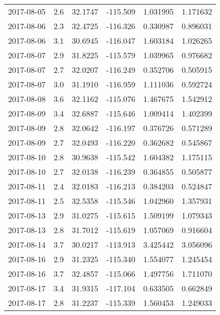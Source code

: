 \begin{tabular}{lrrrrr}
2017-08-05 &       2.6 &  32.1747 &  -115.509 &         1.031995 &         1.171632 \\
2017-08-06 &       2.3 &  32.4725 &  -116.326 &         0.330987 &         0.896031 \\
2017-08-06 &       3.1 &  30.6945 &  -116.047 &         1.603184 &         1.026265 \\
2017-08-07 &       2.9 &  31.8225 &  -115.579 &         1.039965 &         0.976682 \\
2017-08-07 &       2.7 &  32.0207 &  -116.249 &         0.352706 &         0.505915 \\
2017-08-07 &       3.0 &  31.1910 &  -116.959 &         1.111036 &         0.592724 \\
2017-08-08 &       3.6 &  32.1162 &  -115.076 &         1.467675 &         1.542912 \\
2017-08-09 &       3.4 &  32.6887 &  -115.646 &         1.009414 &         1.402399 \\
2017-08-09 &       2.8 &  32.0642 &  -116.197 &         0.376726 &         0.571289 \\
2017-08-09 &       2.7 &  32.0493 &  -116.220 &         0.362682 &         0.545867 \\
2017-08-10 &       2.8 &  30.9638 &  -115.542 &         1.604382 &         1.175115 \\
2017-08-10 &       2.7 &  32.0138 &  -116.239 &         0.364855 &         0.505877 \\
2017-08-11 &       2.4 &  32.0183 &  -116.213 &         0.384203 &         0.524847 \\
2017-08-11 &       2.5 &  32.5358 &  -115.546 &         1.042960 &         1.357931 \\
2017-08-13 &       2.9 &  31.0275 &  -115.615 &         1.509199 &         1.079343 \\
2017-08-13 &       2.8 &  31.7012 &  -115.619 &         1.057069 &         0.916604 \\
2017-08-14 &       3.7 &  30.0217 &  -113.913 &         3.425442 &         3.056096 \\
2017-08-16 &       2.9 &  31.2325 &  -115.340 &         1.554077 &         1.245454 \\
2017-08-16 &       3.7 &  32.4857 &  -115.066 &         1.497756 &         1.711070 \\
2017-08-17 &       3.4 &  31.9315 &  -117.104 &         0.633505 &         0.662849 \\
2017-08-17 &       2.8 &  31.2237 &  -115.339 &         1.560453 &         1.249033 \\

\end{tabular}
